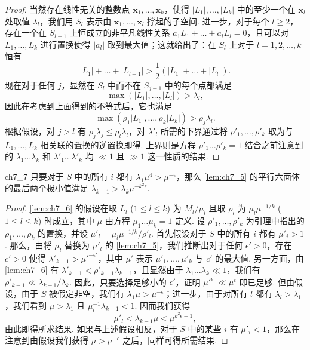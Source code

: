 \begin{proof}
当然存在线性无关的整数点 $\mathbf{x}_1, \ldots, \mathbf{x}_k$，使得 $|L_1|, \ldots, |L_k|$ 中的至少一个在 $\mathbf{x}_l$ 处取值 $\lambda_l$，我们用 $S_l$ 表示由 $\mathbf{x}_1, \ldots, \mathbf{x}_l$ 撑起的子空间. 进一步，对于每个 $l \geq 2$，存在一个在 $S_{l-1}$ 上恒成立的非平凡线性关系 $a_1 L_1 + \ldots + a_l L_l = 0$，且可以对 $L_1, \dots, L_k$ 进行置换使得 $|a_l|$ 取到最大值；这就给出了：在 $S_l$ 上对于 $l = 1, 2, \dots, k$ 恒有
\[|L_1| + \ldots + |L_{l-1}| > \frac{1}{2}(|L_1| + \ldots + |L_l|).\]
现在对于任何 $j$，显然在 $S_l$ 中而不在 $S_{j-1}$ 中的每个点都满足
\[\max (|L_1|, \dots, |L_l|) > \lambda_l,\]
因此在考虑到上面得到的不等式后，它也满足
\[\max (\rho_1 |L_1|, \dots, \rho_k |L_k|) > \rho_j \lambda_l.\]
根据假设，对 $j > l$ 有 $\rho_j \lambda_j \le \rho_l \lambda_l$，对 $\lambda'_l$ 所需的下界通过将 $\rho'_1, \dots, \rho'_k$ 取为与 $L_1, \dots, L_k$ 相关联的置换的逆置换即得. 上界则是方程 $\rho'_1 \dots \rho'_k = 1$ 结合之前注意到的 $\lambda_1 \dots \lambda_k$ 和 $\lambda'_1 \dots \lambda'_k$ 均 $\ll 1$ 且 $\gg 1$ 这一性质的结果.
\end{proof}

\begin{mylemma}{}{ch7_7}
只要对于 $S$ 中的所有 $i$ 都有 $\lambda_1 \mu^4 > \mu^{-\epsilon}$，那么 \autoref{lem:ch7_5} 的平行六面体的最后两个极小值满足 $\lambda_{k-1} > \lambda_k \mu^{-k^2\epsilon}$.
\end{mylemma}

\begin{proof}
\autoref{lem:ch7_6} 的假设在取 $L_l$ ($1 \le l \le k$) 为 $M_l/\mu_l$ 且取 $\rho_l$ 为 $\mu_l \mu^{-1/k}$ ($1 \le l \le k$) 时成立，其中 $\mu$ 由方程 $\mu_1 \dots \mu_k = 1$ 定义. 设 $\rho'_1, \dots, \rho'_k$ 为引理中指出的 $\rho_1, \dots, \rho_k$ 的置换，并设 $\mu'_l = \mu_l \mu^{-1/k}/\rho'_l$. 首先假设对于 $S$ 中的所有 $i$ 都有 $\mu'_i > 1$. 那么，由将 $\mu_l$ 替换为 $\mu'_l$ 的 \autoref{lem:ch7_5}，我们推断出对于任何 $\epsilon' > 0$，存在 $c' > 0$ 使得 $\lambda'_{k-1} > \mu'^{-\epsilon'}$，其中 $\mu'$ 表示 $\mu'_1, \dots, \mu'_k$ 与 $c' $ 的最大值. 另一方面，由 \autoref{lem:ch7_6} 有 $\lambda'_{k-1} < \rho'_{k-1} \lambda_{k-1}$，且显然由于 $\lambda_1 \dots \lambda_k \ll 1$，我们有 $\rho'_{k-1} \ll \lambda_{k-1}/\lambda_k$. 因此，只要选择足够小的 $\epsilon'$，证明 $\mu'^{\epsilon'} \ll \mu^\epsilon$ 即已足够. 但由假设，由于 $S$ 被假定非空，我们有 $\lambda_1 \mu > \mu^{-\epsilon}$；进一步，由于对所有 $l$ 都有 $\lambda_l > \lambda_1$，我们看到 $\mu > \lambda_1$ 且 $\mu_l^{-1} \lambda_{k-1} < 1$. 因而我们获得
\[\mu'_l < \lambda_{k-1}\mu < \mu^{k^2\epsilon+1},\]
由此即得所求结果. 如果与上述假设相反，对于 $S$ 中的某些 $i$ 有 $\mu'_i < 1$，那么在注意到由假设我们获得 $\mu > \mu^{-\epsilon}$ 之后，同样可得所需结果.
\end{proof}

